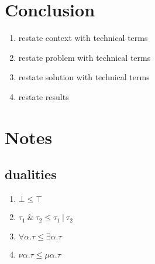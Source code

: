 \documentclass[sigplan,screen]{acmart}
\begin{document}
\section{Conclusion}
\begin{enumerate}
  \item restate context with technical terms 
  \item restate problem with technical terms 
  \item restate solution with technical terms 
  \item restate results 
\end{enumerate}

\section*{Notes}

\subsection*{dualities}
\begin{enumerate}
  \item \(\bot \leq \top \)
  \item \(\tau_1\ \&\ \tau_2  \leq \tau_1\ |\ \tau_2 \)
  \item \(\forall \alpha . \tau \leq \exists \alpha . \tau \)
  \item \(\nu \alpha . \tau \leq \mu \alpha . \tau \)
\end{enumerate}
\end{document}
